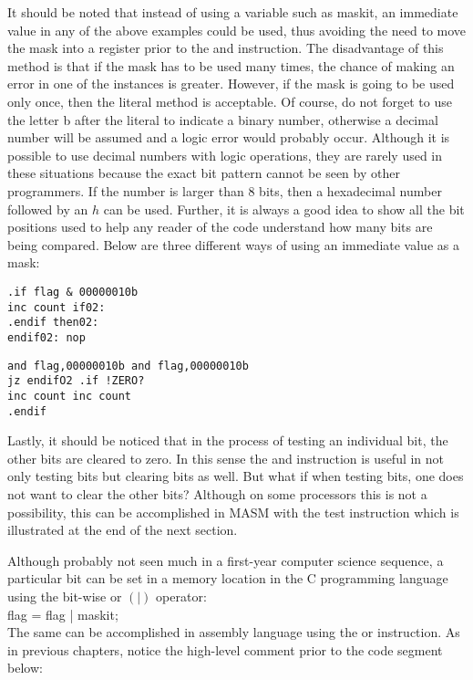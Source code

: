 \documentclass[10pt]{article}
\begin{document}
It should be noted that instead of using a variable such as maskit, an immediate value in any of the above examples could be used, thus avoiding the need to move the mask into a register prior to the and instruction. The disadvantage of this method is that if the mask has to be used many times, the chance of making an error in one of the instances is greater. However, if the mask is going to be used only once, then the literal method is acceptable. Of course, do not forget to use the letter b after the literal to indicate a binary number, otherwise a decimal number will be assumed and a logic error would probably occur. Although it is possible to use decimal numbers with logic operations, they are rarely used in these situations because the exact bit pattern cannot be seen by other programmers. If the number is larger than 8 bits, then a hexadecimal number followed by an $h$ can be used. Further, it is always a good idea to show all the bit positions used to help any reader of the code understand how many bits are being compared. Below are three different ways of using an immediate value as a mask:

\begin{verbatim}
.if flag & 00000010b
inc count if02:
.endif then02:
endif02: nop
\end{verbatim}

\begin{verbatim}
and flag,00000010b and flag,00000010b
jz endifO2 .if !ZERO?
inc count inc count
.endif
\end{verbatim}

Lastly, it should be noticed that in the process of testing an individual bit, the other bits are cleared to zero. In this sense the and instruction is useful in not only testing bits but clearing bits as well. But what if when testing bits, one does not want to clear the other bits? Although on some processors this is not a possibility, this can be accomplished in MASM with the test instruction which is illustrated at the end of the next section.

Although probably not seen much in a first-year computer science sequence, a particular bit can be set in a memory location in the C programming language using the bit-wise or $(\mid)$ operator:\\
flag = flag | maskit;\\
The same can be accomplished in assembly language using the or instruction. As in previous chapters, notice the high-level comment prior to the code segment below:
\end{document}
